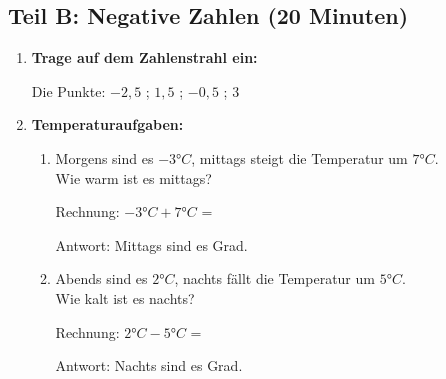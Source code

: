 \subsection*{Teil B: Negative Zahlen (20 Minuten)}

\begin{enumerate}[resume, label=\arabic*.]
    \item \textbf{Trage auf dem Zahlenstrahl ein:}

    Die Punkte: $-2,5$ ; $1,5$ ; $-0,5$ ; $3$   

    \begin{center}
    \end{center}

    \vspace{0.8cm}

    \item \textbf{Temperaturaufgaben:}
    \begin{enumerate}[label=\alph*)]
        \item Morgens sind es $-3°C$, mittags steigt die Temperatur um $7°C$. \\
        Wie warm ist es mittags?

        \vspace{0.3cm}
        Rechnung: $-3°C + 7°C$ = \underline{\hspace{3cm}}

        \vspace{0.3cm}
        Antwort: Mittags sind es \underline{\hspace{3cm}} Grad.

        \vspace{0.5cm}
        \item Abends sind es $2°C$, nachts fällt die Temperatur um $5°C$. \\
        Wie kalt ist es nachts?

        \vspace{0.3cm}
        Rechnung: $2°C - 5°C$ = \underline{\hspace{3cm}}

        \vspace{0.3cm}
        Antwort: Nachts sind es \underline{\hspace{3cm}} Grad.
    \end{enumerate}


\end{enumerate}
